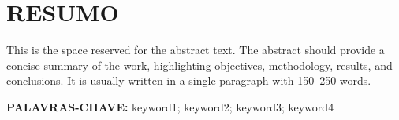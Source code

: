\section*{\fontsize{14}{16}\selectfont
RESUMO
}


\justifying
This is the space reserved for the abstract text. The abstract should provide a concise summary of the work, highlighting objectives, methodology, results, and conclusions. It is usually written in a single paragraph with 150–250 words.

\vspace{0.5cm}

\noindent\textbf{PALAVRAS-CHAVE:} keyword1; keyword2; keyword3; keyword4
